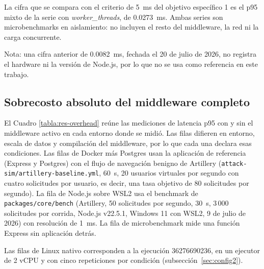 La cifra que se compara con el criterio de 5~ms del objetivo específico 1 es el p95 mixto de la serie con \textit{worker\_threads}, de 0.0273~ms. Ambas series son microbenchmarks en aislamiento: no incluyen el resto del middleware, la red ni la carga concurrente.

\par\smallskip\noindent\footnotesize Nota: una cifra anterior de 0.0082~ms, fechada el 20 de julio de 2026, no registra el hardware ni la versión de Node.js, por lo que no se usa como referencia en este trabajo.\normalsize

\subsection{Sobrecosto absoluto del middleware completo}

El Cuadro \ref{tabla:res-overhead} reúne las mediciones de latencia p95 con y sin el middleware activo en cada entorno donde se midió. Las filas difieren en entorno, escala de datos y compilación del middleware, por lo que cada una declara esas condiciones. Las filas de Docker más Postgres usan la aplicación de referencia (Express y Postgres) con el flujo de navegación benigno de Artillery (\texttt{attack-sim/artillery-baseline.yml}, 60~s, 20 usuarios virtuales por segundo con cuatro solicitudes por usuario, es decir, una tasa objetivo de 80 solicitudes por segundo). La fila de Node.js sobre WSL2 usa el benchmark de \texttt{packages/core/bench} (Artillery, 50 solicitudes por segundo, 30~s, 3\,000 solicitudes por corrida, Node.js v22.5.1, Windows 11 con WSL2, 9 de julio de 2026) con resolución de 1~ms. La fila de microbenchmark mide una función Express sin aplicación detrás.

Las filas de Linux nativo corresponden a la ejecución 36276690236, en un ejecutor de 2 vCPU y con cinco repeticiones por condición (subsección~\ref{sec:config2}).

